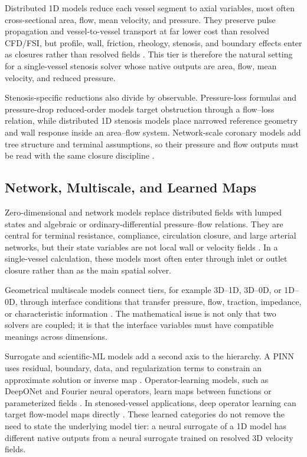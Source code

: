Distributed 1D models reduce each vessel segment to axial variables, most often
cross-sectional area, flow, mean velocity, and pressure. They preserve pulse
propagation and vessel-to-vessel transport at far lower cost than resolved
CFD/FSI, but profile, wall, friction, rheology, stenosis, and boundary effects
enter as closures rather than resolved fields
\cite{FormaggiaEtAl2003OneDimensionalBloodFlow,KopplHelmig2023DimensionReducedModeling}.
This tier is therefore the natural setting for a single-vessel stenosis solver
whose native outputs are area, flow, mean velocity, and reduced pressure.

Stenosis-specific reductions also divide by observable. Pressure-loss formulas
and pressure-drop reduced-order models target obstruction through a flow--loss
relation, while distributed 1D stenosis models place narrowed reference geometry
and wall response inside an area--flow system. Network-scale coronary models add
tree structure and terminal assumptions, so their pressure and flow outputs must
be read with the same closure discipline
\cite{LyrasLee2021PressureDropROM,DuanmuEtAl2019CoronaryArterialTree,CanicEtAl2024Extended1DStenosis}.

\subsection{Network, Multiscale, and Learned Maps}
\label{subsec:network-multiscale-learned-models}

Zero-dimensional and network models replace distributed fields with lumped
states and algebraic or ordinary-differential pressure--flow relations. They are
central for terminal resistance, compliance, circulation closure, and large
arterial networks, but their state variables are not local wall or velocity
fields \cite{ShiEtAl2011BloodFlowModelReview}. In a single-vessel calculation,
these models most often enter through inlet or outlet closure rather than as the
main spatial solver.

Geometrical multiscale models connect tiers, for example 3D--1D, 3D--0D, or
1D--0D, through interface conditions that transfer pressure, flow, traction,
impedance, or characteristic information
\cite{QuarteroniVeneziani2003GeometricalMultiscale,FormaggiaEtAl2007FSICoupling}.
The mathematical issue is not only that two solvers are coupled; it is that the
interface variables must have compatible meanings across dimensions.

Surrogate and scientific-ML models add a second axis to the hierarchy. A PINN
uses residual, boundary, data, and regularization terms to constrain an
approximate solution or inverse map
\cite{RaissiEtAl2019PhysicsInformedNeuralNetworks,YuEtAl2026PINNHemodynamicsReview}.
Operator-learning models, such as DeepONet and Fourier neural operators, learn
maps between functions or parameterized fields
\cite{LuEtAl2021DeepONet,LiEtAl2021FNO}. In stenosed-vessel applications, deep
operator learning can target flow-model maps directly
\cite{VelikorodnyEtAl2025DeepOperatorStenosed}. These learned categories do not
remove the need to state the underlying model tier: a neural surrogate of a 1D
model has different native outputs from a neural surrogate trained on resolved
3D velocity fields.

